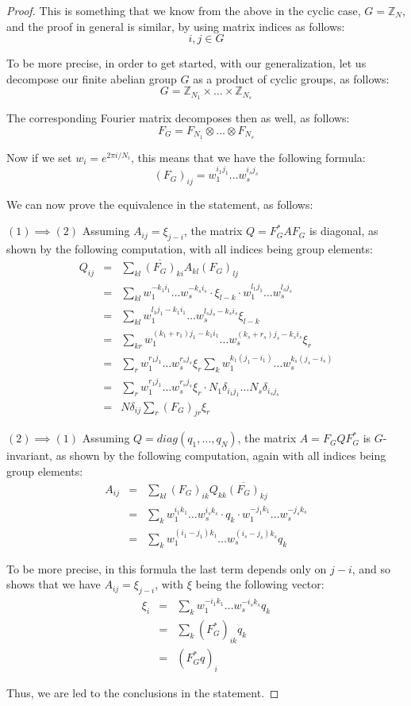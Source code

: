 \documentclass[12pt]{amsbook}
\begin{document}
\begin{proof}
This is something that we know from the above in the cyclic case, $G=\mathbb Z_N$, and the proof in general is similar, by using matrix indices as follows:
$$i,j\in G$$

To be more precise, in order to get started, with our generalization, let us decompose our finite abelian group $G$ as a product of cyclic groups, as follows:
$$G=\mathbb Z_{N_1}\times\ldots\times\mathbb Z_{N_s}$$

The corresponding Fourier matrix decomposes then as well, as follows:
$$F_G=F_{N_1}\otimes\ldots\otimes F_{N_s}$$

Now if we set $w_i=e^{2\pi i/N_i}$, this means that we have the following formula:
$$(F_G)_{ij}=w_1^{i_1j_1}\ldots w_s^{i_sj_s}$$

We can now prove the equivalence in the statement, as follows:

\medskip

$(1)\implies(2)$ Assuming $A_{ij}=\xi_{j-i}$, the matrix $Q=F_G^*AF_G$ is diagonal, as shown by the following computation, with all indices being group elements:
\begin{eqnarray*}
Q_{ij}
&=&\sum_{kl}\overline{(F_G)}_{ki}A_{kl}(F_G)_{lj}\\
&=&\sum_{kl}w_1^{-k_1i_1}\ldots w_s^{-k_si_s}\cdot\xi_{l-k}\cdot w_1^{l_1j_1}\ldots w_s^{l_sj_s}\\
&=&\sum_{kl}w_1^{l_1j_1-k_1i_1}\ldots w_s^{l_sj_s-k_si_s}\xi_{l-k}\\
&=&\sum_{kr}w_1^{(k_1+r_1)j_1-k_1i_1}\ldots w_s^{(k_s+r_s)j_s-k_si_s}\xi_r\\
&=&\sum_rw_1^{r_1j_1}\ldots w_s^{r_sj_s}\xi_r\sum_kw_1^{k_1(j_1-i_1)}\ldots w_s^{k_s(j_s-i_s)}\\
&=&\sum_rw_1^{r_1j_1}\ldots w_s^{r_sj_s}\xi_r\cdot N_1\delta_{i_1j_1}\ldots N_s\delta_{i_sj_s}\\
&=&N\delta_{ij}\sum_r(F_G)_{jr}\xi_r
\end{eqnarray*}

$(2)\implies(1)$ Assuming $Q=diag(q_1,\ldots,q_N)$, the matrix $A=F_GQF_G^*$ is $G$-invariant, as shown by the following computation, again with all indices being group elements:
\begin{eqnarray*}
A_{ij}
&=&\sum_{kl}(F_G)_{ik}Q_{kk}\overline{(F_G)}_{kj}\\
&=&\sum_kw_1^{i_1k_1}\ldots w_s^{i_sk_s}\cdot q_k\cdot w_1^{-j_1k_1}\ldots w_s^{-j_sk_s}\\
&=&\sum_kw_1^{(i_1-j_1)k_1}\ldots w_s^{(i_s-j_s)k_s}q_k
\end{eqnarray*}

To be more precise, in this formula the last term depends only on $j-i$, and so shows that we have $A_{ij}=\xi_{j-i}$, with $\xi$ being the following vector:
\begin{eqnarray*}
\xi_i
&=&\sum_kw_1^{-i_1k_1}\ldots w_s^{-i_sk_s}q_k\\
&=&\sum_k(F_G^*)_{ik}q_k\\
&=&(F_G^*q)_i
\end{eqnarray*}

Thus, we are led to the conclusions in the statement.
\end{proof}
\end{document}
